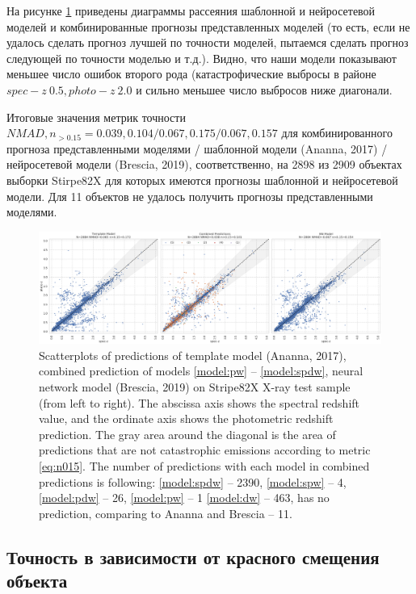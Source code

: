 \documentclass[fleqn,usenatbib]{mnras}
\begin{document}
На рисунке \ref{fig:scatter-s82x-sota35} приведены диаграммы рассеяния шаблонной и нейросетевой моделей и комбинированные прогнозы представленных моделей (то есть, если не удалось сделать прогноз лучшей по точности моделей, пытаемся сделать прогноз следующей по точности моделью и т.д.). Видно, что наши модели показывают меньшее число ошибок второго рода (катастрофические выбросы в районе $spec-z ~ 0.5, photo-z ~ 2.0$ и сильно меньшее число выбросов ниже диагонали.

Итоговые значения метрик точности $NMAD, n_{>0.15} = 0.039, 0.104/ 0.067, 0.175/ 0.067, 0.157$ для комбинированного прогноза представленными моделями / шаблонной модели (Ananna, 2017) / нейросетевой модели (Brescia, 2019), соответственно, на 2898 из 2909 объектах выборки Stirpe82X для которых имеются прогнозы шаблонной и нейросетевой модели. Для 11 объектов не удалось получить прогнозы представленными моделями.

\begin{figure}
    \centering
    \includegraphics[width=0.9\linewidth]{images/stripe82x-sota35-colored.png}
    \caption{Scatterplots of predictions of template model (Ananna, 2017), combined prediction of models \ref{model:pw} -- \ref{model:spdw}, neural network model (Brescia, 2019) on Stripe82X X-ray test sample (from left to right). The abscissa axis shows the spectral redshift value, and the ordinate axis shows the photometric redshift prediction. The gray area around the diagonal is the area of predictions that are not catastrophic emissions according to metric \eqref{eq:n015}. The number of predictions with each model in combined predictions is following: \ref{model:spdw} -- 2390, \ref{model:spw} -- 4, \ref{model:pdw} -- 26, \ref{model:pw} -- 1 \ref{model:dw} -- 463, has no prediction, comparing to Ananna and Brescia -- 11.}
    \label{fig:scatter-s82x-sota35}
\end{figure}

\subsection{Точность в зависимости от красного смещения объекта}\label{ssec:accuracy-as-fzspec}
\end{document}
